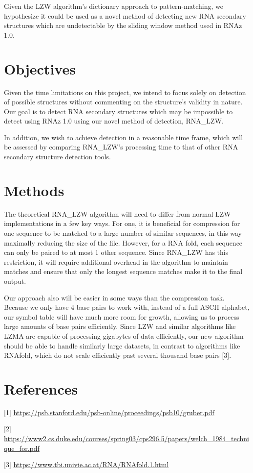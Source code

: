 \documentclass[letterpaper, 12pt]{artikel3}
\begin{document}
Given the LZW algorithm's dictionary approach to pattern-matching, we hypothesize it could be used as a novel method of detecting new RNA secondary structures which are undetectable by the sliding window method used in RNAz 1.0. 
\section*{Objectives}
Given the time limitations on this project, we intend to focus solely on detection of possible structures without commenting on the structure's validity in nature.  Our goal is to detect RNA secondary structures which may be impossible to detect using RNAz 1.0 using our novel method of detection, RNA\_LZW. 

In addition, we wish to achieve detection in a reasonable time frame, which will be assessed by comparing RNA\_LZW's processing time to that of other RNA secondary structure detection tools. 

\section*{Methods}

The theoretical RNA\_LZW algorithm will need to differ from normal LZW implementations in a few key ways. For one, it is beneficial for compression for one sequence to be matched to a large number of similar sequences, in this way maximally reducing the size of the file. However, for a RNA fold, each sequence can only be paired to at most 1 other sequence. Since RNA\_LZW has this restriction, it will require additional overhead in the algorithm to maintain matches and ensure that only the longest sequence matches make it to the final output. 

Our approach also will be easier in some ways than the compression task. Because we only have 4 base pairs to work with, instead of a full ASCII alphabet, our symbol table will have much more room for growth, allowing us to process large amounts of base pairs efficiently. Since LZW and similar algorithms like LZMA are capable of processing gigabytes of data efficiently, our new algorithm should be able to handle similarly large datasets, in contrast to algorithms like RNAfold, which do not scale efficiently past several thousand base pairs [3].

\section*{References}

[1] \url{https://psb.stanford.edu/psb-online/proceedings/psb10/gruber.pdf}

[2] \url{https://www2.cs.duke.edu/courses/spring03/cps296.5/papers/welch_1984_technique_for.pdf}

[3] \url{https://www.tbi.univie.ac.at/RNA/RNAfold.1.html}
\end{document}
